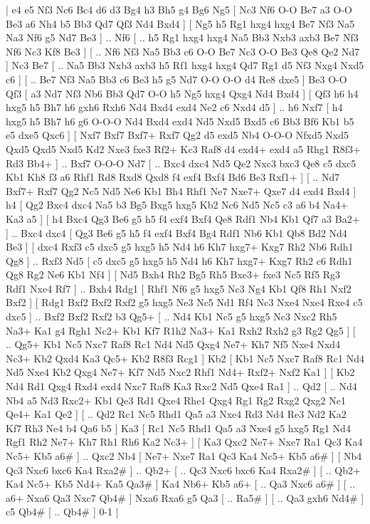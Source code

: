 \makegametitle 
|   e4   e5    Nf3   Nc6    Bc4   d6    d3   Bg4    h3   Bh5    g4   Bg6    Ng5 [  Nc3 Nf6  O-O Be7  a3 O-O  Be3 a6  Nh4 b5  Bb3 Qd7  Qf3 Nd4  Bxd4   ]  [  Ng5 h5  Rg1 hxg4  hxg4 Be7  Nf3 Na5  Na3 Nf6  g5 Nd7  Be3   ] .. Nf6 [ .. h5  Rg1 hxg4  hxg4 Na5  Bb3 Nxb3  axb3 Be7  Nf3 Nf6  Nc3 Kf8  Be3   ]  [ .. Nf6  Nf3 Na5  Bb3 c6  O-O Be7  Nc3 O-O  Be3 Qe8  Qe2 Nd7   ]  Nc3   Be7 [ .. Na5  Bb3 Nxb3  axb3 h5  Rf1 hxg4  hxg4 Qd7  Rg1 d5  Nf3 Nxg4  Nxd5 c6   ]  [ .. Be7  Nf3 Na5  Bb3 c6  Be3 h5  g5 Nd7  O-O O-O  d4 Re8  dxe5   ]  Be3   O-O    Qf3 [  a3 Nd7  Nf3 Nb6  Bb3 Qd7  O-O h5  Ng5 hxg4  Qxg4 Nd4  Bxd4   ]  [  Qf3 h6  h4 hxg5  h5 Bh7  h6 gxh6  Rxh6 Nd4  Bxd4 exd4  Ne2 c6  Nxd4 d5   ] .. h6    Nxf7 [  h4 hxg5  h5 Bh7  h6 g6  O-O-O Nd4  Bxd4 exd4  Nd5 Nxd5  Bxd5 c6  Bb3 Bf6  Kb1 b5  e5 dxe5  Qxc6   ]  [  Nxf7 Bxf7  Bxf7+ Rxf7  Qg2 d5  exd5 Nb4  O-O-O Nfxd5  Nxd5 Qxd5  Qxd5 Nxd5  Kd2 Nxe3  fxe3 Rf2+  Kc3 Raf8  d4 exd4+  exd4 a5  Rhg1 R8f3+  Rd3 Bb4+   ] .. Bxf7    O-O-O   Nd7 [ .. Bxc4  dxc4 Nd5  Qe2 Nxc3  bxc3 Qe8  c5 dxc5  Kb1 Kh8  f3 a6  Rhf1 Rd8  Rxd8 Qxd8  f4 exf4  Bxf4 Bd6  Be3 Rxf1+   ]  [ .. Nd7  Bxf7+ Rxf7  Qg2 Nc5  Nd5 Ne6  Kb1 Bh4  Rhf1 Ne7  Nxe7+ Qxe7  d4 exd4  Bxd4   ]  h4 [  Qg2 Bxc4  dxc4 Na5  b3 Bg5  Bxg5 hxg5  Kb2 Nc6  Nd5 Nc5  c3 a6  b4 Na4+  Ka3 a5   ]  [  h4 Bxc4  Qg3 Be6  g5 h5  f4 exf4  Bxf4 Qe8  Rdf1 Nb4  Kb1 Qf7  a3 Ba2+   ] .. Bxc4    dxc4 [  Qg3 Be6  g5 h5  f4 exf4  Bxf4 Bg4  Rdf1 Nb6  Kb1 Qb8  Bd2 Nd4  Be3   ]  [  dxc4 Rxf3  c5 dxc5  g5 hxg5  h5 Nd4  h6 Kh7  hxg7+ Kxg7  Rh2 Nb6  Rdh1 Qg8   ] .. Rxf3    Nd5 [  c5 dxc5  g5 hxg5  h5 Nd4  h6 Kh7  hxg7+ Kxg7  Rh2 c6  Rdh1 Qg8  Rg2 Ne6  Kb1 Nf4   ]  [  Nd5 Bxh4  Rh2 Bg5  Rh5 Bxe3+  fxe3 Nc5  Rf5 Rg3  Rdf1 Nxe4  Rf7   ] .. Bxh4    Rdg1 [  Rhf1 Nf6  g5 hxg5  Nc3 Ng4  Kb1 Qf8  Rh1 Nxf2  Bxf2   ]  [  Rdg1 Bxf2  Bxf2 Rxf2  g5 hxg5  Ne3 Nc5  Nd1 Rf4  Nc3 Nxe4  Nxe4 Rxe4  c5 dxc5   ] .. Bxf2    Bxf2   Rxf2    b3   Qg5+ [ .. Nd4  Kb1 Nc5  g5 hxg5  Nc3 Nxc2  Rh5 Na3+  Ka1 g4  Rgh1 Nc2+  Kb1 Kf7  R1h2 Na3+  Ka1 Rxh2  Rxh2 g3  Rg2 Qg5   ]  [ .. Qg5+  Kb1 Nc5  Nxc7 Raf8  Rc1 Nd4  Nd5 Qxg4  Ne7+ Kh7  Nf5 Nxe4  Nxd4 Nc3+  Kb2 Qxd4  Ka3 Qc5+  Kb2 R8f3  Rcg1   ]  Kb2 [  Kb1 Nc5  Nxc7 Raf8  Rc1 Nd4  Nd5 Nxe4  Kb2 Qxg4  Ne7+ Kf7  Nd5 Nxc2  Rhf1 Nd4+  Rxf2+ Nxf2  Ka1   ]  [  Kb2 Nd4  Rd1 Qxg4  Rxd4 exd4  Nxc7 Raf8  Ka3 Rxc2  Nd5 Qxe4  Ra1   ] .. Qd2 [ .. Nd4  Nb4 a5  Nd3 Rxc2+  Kb1 Qe3  Rd1 Qxe4  Rhe1 Qxg4  Rg1 Rg2  Rxg2 Qxg2  Ne1 Qe4+  Ka1 Qe2   ]  [ .. Qd2  Rc1 Nc5  Rhd1 Qa5  a3 Nxe4  Rd3 Nd4  Re3 Nd2  Ka2 Kf7  Rh3 Ne4  b4 Qa6  b5   ]  Ka3 [  Rc1 Nc5  Rhd1 Qa5  a3 Nxe4  g5 hxg5  Rg1 Nd4  Rgf1 Rh2  Ne7+ Kh7  Rh1 Rh6  Ka2 Nc3+   ]  [  Ka3 Qxc2  Ne7+ Nxe7  Ra1 Qc3  Ka4 Nc5+  Kb5 a6#   ] .. Qxc2    Nb4 [  Ne7+ Nxe7  Ra1 Qc3  Ka4 Nc5+  Kb5 a6#   ]  [  Nb4 Qc3  Nxc6 bxc6  Ka4 Rxa2#   ] .. Qb2+ [ .. Qc3  Nxc6 bxc6  Ka4 Rxa2#   ]  [ .. Qb2+  Ka4 Nc5+  Kb5 Nd4+  Ka5 Qa3#   ]  Ka4  Nb6+    Kb5  a6+ [ .. Qa3  Nxc6 a6#   ]  [ .. a6+  Nxa6 Qa3  Nxc7 Qb4#   ]  Nxa6  Rxa6    g5   Qa3 [ .. Ra5#   ]  [ .. Qa3  gxh6 Nd4#   ]  c5   Qb4#    [ .. Qb4#   ] 0-1  |
